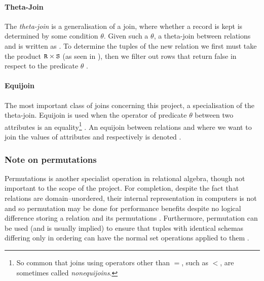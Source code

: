 \paragraph{Theta-Join} The \emph{theta-join} is a generalisation of a join, where whether a record is kept is determined by some condition $\theta$. Given such a $\theta$, a theta-join between relations  and  is written as . To determine the tuples of the new relation  we first must take the product $\mathtt{R} \times \mathtt{S}$ (as seen in ), then we filter out rows that return false in respect to the predicate $\theta$ \cite{DatabaseSystems}.

\paragraph{Equijoin} The most important class of joins concerning this project, a specialisation of the theta-join. Equijoin is used when the operator of predicate $\theta$ between two attributes is an equality\footnote{So common that joins using operators other than $=$, such as $<$, are sometimes called \emph{nonequijoins}\cite{JoinProcessing}.} \cite{JoinProcessing}. An equijoin between relations  and  where we want to join the values of attributes  and  respectively is denoted .

\subsubsection{Note on permutations}
Permutations is another specialist operation in relational algebra, though not important to the scope of the project. For completion, despite the fact that relations are domain--unordered, their internal representation in computers is not and so permutation may be done for performance benefits despite no logical difference storing a relation and its permutations \cite{RelationalModel}. Furthermore, permutation can be used (and is usually implied) to ensure that tuples with identical schemas differing only in ordering can have the normal set operations applied to them \cite{DatabaseSystems}.
